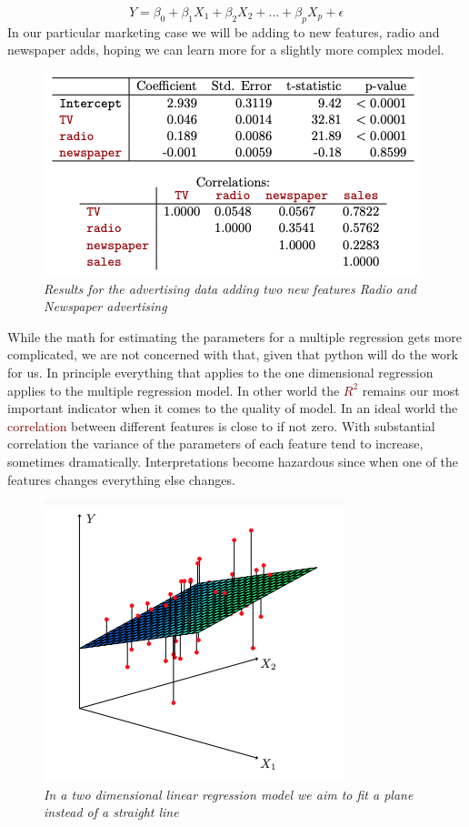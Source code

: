 \documentclass{tufte-handout}
\newcommand{\hlred}[1]{\textcolor{Maroon}{#1}}%
\begin{document}
\begin{equation}
    Y = \beta_0 + \beta_1X_1 +\beta_2X_2 + ... + \beta_pX_p + \epsilon
\end{equation}
In our particular marketing case we will be adding to new features, radio and newspaper adds, hoping we can learn more for a slightly more complex model. 
\begin{figure}
  \includegraphics{reg5.png}
  \caption{
  \emph{Results for the advertising data adding two new features Radio and Newspaper advertising}}
  \label{fig:textfig}
\end{figure}
While the math for estimating the parameters for a multiple regression gets more complicated, we are not concerned with that, given that python will do the work for us. In principle everything that applies to the one dimensional regression applies to the multiple regression model. In other world the \hlred{\(R^2\)} remains our most important indicator when it comes to the quality of model.
In an ideal world the \hlred{correlation} between different features is close to if not zero. With substantial correlation the variance of the parameters of each feature tend to increase, sometimes dramatically. Interpretations become hazardous since when one of the features changes everything else changes.  
 \begin{figure}
  \includegraphics{reg_4.png}
  \caption{
  \emph{In a two dimensional linear regression model we aim to fit a plane instead of a straight line}}
  \label{fig:textfig}
\end{figure}
\end{document}
